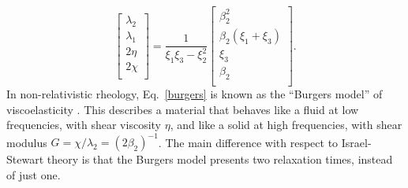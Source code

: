 \documentclass[a4paper, amsfonts, amssymb, amsmath, reprint, showkeys, nofootinbib, twoside, onecolumn,notitlepage]{revtex4-1}
\begin{document}
\begin{equation}
\begin{bmatrix}
\lambda_2 \\
\lambda_1 \\
2\eta \\
2\chi \\
\end{bmatrix}
= \dfrac{1}{\xi_1 \xi_3 - \xi_2^2} 
\begin{bmatrix}
\beta_2^2 \\
\beta_2 (\xi_1+\xi_3)\\
\xi_3 \\
 \beta_2 \\
\end{bmatrix} .
\end{equation}
In non-relativistic rheology, Eq.\  \eqref{burgers} is known as the ``Burgers model'' of viscoelasticity \cite{Findley_book,Prieto2014,Malek2018}. This describes a material that behaves like a fluid at low frequencies, with shear viscosity $\eta$, and like a solid at high frequencies, with shear modulus $G=\chi/\lambda_2=(2\beta_2)^{-1}$. The main difference with respect to Israel-Stewart theory is that the Burgers model presents two relaxation times, instead of just one. 
\end{document}
